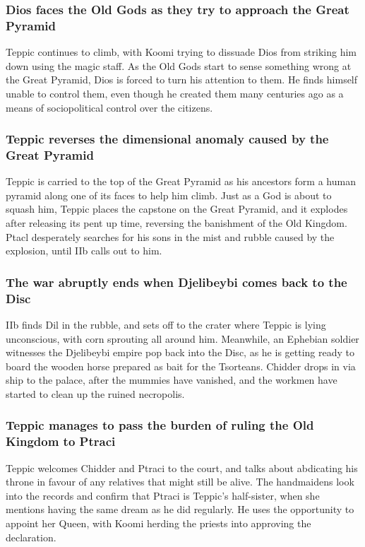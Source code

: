 \subsubsection{\Gls{Dios} faces the Old Gods as they try to approach the Great Pyramid}
\Gls{Teppic} continues to climb, with \Gls{Koomi} trying to dissuade \Gls{Dios} from striking him
down using the magic staff. As the Old Gods start to sense something wrong at the Great Pyramid,
\Gls{Dios} is forced to turn his attention to them. He finds himself unable to control them, even
though he created them many centuries ago as a means of sociopolitical control over the citizens.

\subsubsection{\Gls{Teppic} reverses the dimensional anomaly caused by the Great Pyramid}
\Gls{Teppic} is carried to the top of the Great Pyramid as his ancestors form a human pyramid along
one of its faces to help him climb. Just as a God is about to squash him, \Gls{Teppic} places the
capstone on the Great Pyramid, and it explodes after releasing its pent up time, reversing the
banishment of the Old Kingdom. \Gls{Ptacl} desperately searches for his sons in the mist and rubble
caused by the explosion, until \Gls{IIb} calls out to him.

\subsubsection{The war abruptly ends when Djelibeybi comes back to the Disc}
\Gls{IIb} finds \Gls{Dil} in the rubble, and sets off to the crater where \Gls{Teppic} is lying
unconscious, with corn sprouting all around him. Meanwhile, an Ephebian soldier witnesses the
Djelibeybi empire pop back into the Disc, as he is getting ready to board the wooden horse prepared
as bait for the Tsorteans. \Gls{Chidder} drops in via ship to the palace, after the mummies have
vanished, and the workmen have started to clean up the ruined necropolis.

\subsubsection{\Gls{Teppic} manages to pass the burden of ruling the Old Kingdom to \Gls{Ptraci}}
\Gls{Teppic} welcomes \Gls{Chidder} and \Gls{Ptraci} to the court, and talks about abdicating his
throne in favour of any relatives that might still be alive. The handmaidens look into the records
and confirm that \Gls{Ptraci} is \Gls{Teppic}'s half-sister, when she mentions having the same
dream as he did regularly. He uses the opportunity to appoint her Queen, with \Gls{Koomi} herding
the priests into approving the declaration.

